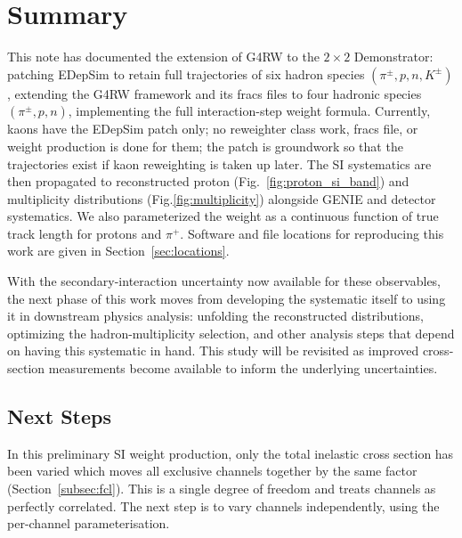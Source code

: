 \documentclass[%
article,
nofootinbib
]{revtex4-2}
\begin{document}
\section{\label{sec:status}Summary}

This note has documented the extension of G4RW to the $2\times2$ Demonstrator: patching
EDepSim to retain full trajectories of six hadron species $(\pi^\pm,p,n,K^\pm)$, extending the G4RW framework and its fracs
files to four hadronic species $(\pi^\pm,p,n)$, implementing the full interaction-step weight
formula. Currently, kaons have the EDepSim patch only; no reweighter class work, fracs file, or weight production is done for them; the patch is groundwork
so that the trajectories exist if kaon reweighting is taken up later. 
The SI systematics are then propagated to reconstructed proton (Fig.~\ref{fig:proton_si_band}) and multiplicity distributions (Fig.\ref{fig:multiplicity}) alongside GENIE and
detector systematics. We also parameterized the weight as a continuous
function of true track length for protons and $\pi^+$. Software and file locations for reproducing this
work are given in Section~\ref{sec:locations}.

With the secondary-interaction uncertainty now available for these
observables, the next phase of this work moves from developing the
systematic itself to using it in downstream physics analysis: unfolding
the reconstructed distributions, optimizing the hadron-multiplicity
selection, and other analysis steps that depend on having this systematic
in hand. This study will be revisited as improved cross-section measurements become available to inform the underlying uncertainties.

\iffalse
\subsection{\label{subsec:next_per_channel}Next Steps}

In this preliminary SI weight production, only the total inelastic cross section has been varied which moves all exclusive channels together by the
same factor (Section~\ref{subsec:fcl}). This is a single degree of freedom and
treats channels as perfectly correlated.
The next step is to vary channels independently, using the per-channel parameterisation.
\end{document}
